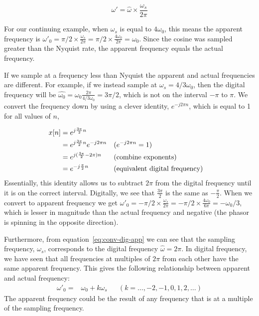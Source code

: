\begin{equation}
\omega' = \hat{\omega}\times \frac{\omega_s}{2\pi} \label{eq:conv-dig-app}
\end{equation}

For our continuing example, when $\omega_s$ is equal to $4\omega_0$, this means the apparent frequency is $\omega'_0=\pi/2\times \frac{\omega_s}{2\pi}=\pi/2\times \frac{4\omega_0}{2\pi}=\omega_0$. Since the cosine was sampled greater than the Nyquist rate, the apparent frequency equals the actual frequency. 

If we sample at a frequency less than Nyquist the apparent and actual frequencies are different. For example, if we instead sample at $\omega_s=4/3\omega_0$, then the digital frequency will be $\hat{\omega_0}=\omega_0 \frac{2\pi}{4/3\omega_0}=3\pi/2$, which is not on the interval  $-\pi$ to $\pi$. We convert the frequency down by using a clever identity, $e^{-j2\pi n}$, which is equal to 1 for all values of $n$,

\begin{align}
x[n] & = e^{j \frac{3\pi}{2}n} \notag\\
  & = e^{j \frac{3\pi}{2}n} e^{-j2\pi n} && (e^{-j2\pi n}=1)\notag\\
  & = e^{j (\frac{3\pi}{2} -2\pi)n} && (\text{combine exponents})\notag\\
  & = e^{-j \frac{\pi}{2}n} && (\text{equivalent digital frequency}) \notag
\end{align}
%
Essentially, this identity allows us to subtract $2\pi$ from the digital frequency until it is on the correct interval. Digitally, we see that  $\frac{3\pi}{2}$ is the same as $-\frac{\pi}{2}$. When we convert to apparent frequency we get $\omega'_0=-\pi/2\times \frac{\omega_s}{2\pi}=-\pi/2\times \frac{4\omega_0}{6\pi}=-\omega_0/3$, which is lesser in magnitude than the actual frequency and negative (the phasor is spinning in the opposite direction).

Furthermore, from equation~\ref{eq:conv-dig-app} we can see that the sampling frequency, $\omega_s$, corresponds to the digital frequency $\hat{\omega}=2\pi$. In digital frequency, we have seen that all frequencies at multiples of $2\pi$ from each other have the same apparent frequency. This gives the following relationship between apparent and actual frequency:
 \begin{align}
 \omega'_0 =&\omega_0 + k \omega_s && (k = \ldots, -2, -1, 0, 1, 2, \ldots)
 \end{align}
The apparent frequency could be the result of any frequency that is at a multiple of the sampling frequency. 

